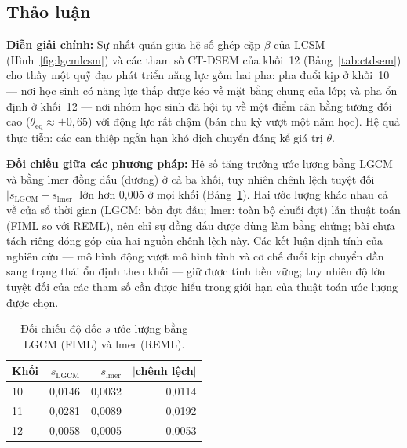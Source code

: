 
\subsection{Thảo luận}
\label{sec:discussion}

\textbf{Diễn giải chính:} Sự nhất quán giữa hệ số ghép cặp \(\beta\) của LCSM (Hình~\ref{fig:lgcmlcsm}) và các tham số CT-DSEM của khối~12 (Bảng~\ref{tab:ctdsem}) cho thấy một quỹ đạo phát triển năng lực gồm hai pha: pha đuổi kịp ở khối~10 --- nơi học sinh có năng lực thấp được kéo về mặt bằng chung của lớp; và pha ổn định ở khối~12 --- nơi nhóm học sinh đã hội tụ về một điểm cân bằng tương đối cao (\(\theta_{\mathrm{eq}} \approx +0{,}65\)) với động lực rất chậm (bán chu kỳ vượt một năm học). Hệ quả thực tiễn: các can thiệp ngắn hạn khó dịch chuyển đáng kể giá trị \(\theta\).

\textbf{Đối chiếu giữa các phương pháp:} Hệ số tăng trưởng ước lượng bằng LGCM và bằng lmer đồng dấu (dương) ở cả ba khối, tuy nhiên chênh lệch tuyệt đối \(|s_{\mathrm{LGCM}} - s_{\mathrm{lmer}}|\) lớn hơn 0{,}005 ở mọi khối (Bảng~\ref{tab:convergent}). Hai ước lượng khác nhau cả về cửa sổ thời gian (LGCM: bốn đợt đầu; lmer: toàn bộ chuỗi đợt) lẫn thuật toán (FIML so với REML), nên chỉ sự đồng dấu được dùng làm bằng chứng; bài chưa tách riêng đóng góp của hai nguồn chênh lệch này. Các kết luận định tính của nghiên cứu --- mô hình động vượt mô hình tĩnh và cơ chế đuổi kịp chuyển dần sang trạng thái ổn định theo khối --- giữ được tính bền vững; tuy nhiên độ lớn tuyệt đối của các tham số cần được hiểu trong giới hạn của thuật toán ước lượng được chọn.

\begin{table}[H]
\centering\small
\caption{Đối chiếu độ dốc $s$ ước lượng bằng LGCM (FIML) và lmer (REML).}
\label{tab:convergent}
\begin{tabular}{lrrr}
\toprule
\textbf{Khối} & \textbf{$s_{\mathrm{LGCM}}$} & \textbf{$s_{\mathrm{lmer}}$} & \textbf{$|$chênh lệch$|$} \\
\midrule
10 & 0{,}0146 & 0{,}0032 & 0{,}0114 \\
11 & 0{,}0281 & 0{,}0089 & 0{,}0192 \\
12 & 0{,}0058 & 0{,}0005 & 0{,}0053 \\
\bottomrule
\end{tabular}
\end{table}

